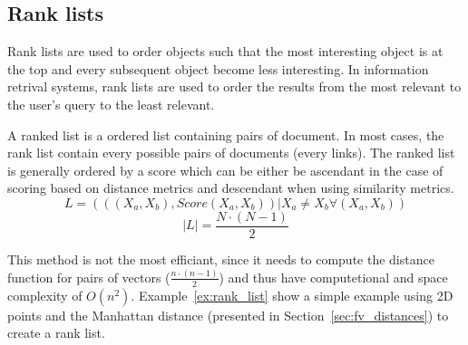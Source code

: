 \subsection{Rank lists}

Rank lists are used to order objects such that the most interesting object is at the top and every subsequent object become less interesting.
In information retrival systems, rank lists are used to order the results from the most relevant to the user's query to the least relevant.

\begin{definition}
  A ranked list is a ordered list containing pairs of document.
  In most cases, the rank list contain every possible pairs of documents (every links).
  The ranked list is generally ordered by a score which can be either be ascendant in the case of scoring based on distance metrics and descendant when using similarity metrics.
  \begin{equation}
    L = (((X_a, X_b), Score(X_a, X_b)) | X_a \neq X_b \forall (X_a, X_b))
  \end{equation}
  \begin{equation}
    |L| = \frac{N \cdot (N - 1)}{2}
  \end{equation}
\end{definition}

This method is not the most efficiant, since it needs to compute the distance function for pairs of vectors ($\frac{n \cdot (n - 1)}{2}$) and thus have computetional and space complexity of $O(n^2)$.
Example~\ref{ex:rank_list} show a simple example using 2D points and the Manhattan distance (presented in Section~\ref{sec:fv_distances}) to create a rank list.

